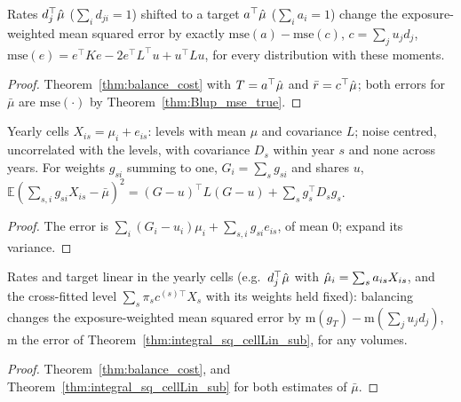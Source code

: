 \begin{theorem}\label{thm:Core_balance_cost_portLin}
  \leanok
  Rates $d_j^\top\hat\mu$ ($\sum_i d_{ji} = 1$) shifted to a target $a^\top\hat\mu$ ($\sum_i a_i = 1$) change
  the exposure-weighted mean squared error by exactly $\mathrm{mse}(a) - \mathrm{mse}(c)$,
  $c = \sum_j u_jd_j$, $\mathrm{mse}(e) = e^\top Ke - 2e^\top L^\top u + u^\top Lu$, for every
  distribution with these moments.
\end{theorem}
\begin{proof}
  \leanok
  Theorem~\ref{thm:balance_cost} with $T = a^\top\hat\mu$ and $\bar r = c^\top\hat\mu$; both errors for
  $\bar\mu$ are $\mathrm{mse}(\cdot)$ by Theorem~\ref{thm:Blup_mse_true}.
\end{proof}

\begin{theorem}\label{thm:integral_sq_cellLin_sub}
  \leanok
  Yearly cells $X_{is} = \mu_i + e_{is}$: levels with mean $\mu$ and covariance $L$; noise centred,
  uncorrelated with the levels, with covariance $D_s$ within year $s$ and none across years. For weights
  $g_{si}$ summing to one, $G_i = \sum_s g_{si}$ and shares $u$,
  $\mathbb E(\sum_{s,i}g_{si}X_{is} - \bar\mu)^2 = (G - u)^\top L(G - u) + \sum_s g_s^\top D_sg_s$.
\end{theorem}
\begin{proof}
  \leanok
  The error is $\sum_i(G_i - u_i)\mu_i + \sum_{s,i}g_{si}e_{is}$, of mean $0$; expand its variance.
\end{proof}

\begin{theorem}\label{thm:balance_cost_cellLin}
  \leanok
  Rates and target linear in the yearly cells (e.g.\ $d_j^\top\hat\mu$ with $\hat\mu_i = \sum_s a_{is}X_{is}$, and
  the cross-fitted level $\sum_s\pi_sc^{(s)\top}X_s$ with its weights held fixed): balancing changes the
  exposure-weighted mean squared error by $\mathrm m(g_T) - \mathrm m(\sum_j u_jd_j)$, $\mathrm m$ the error
  of Theorem~\ref{thm:integral_sq_cellLin_sub}, for any volumes.
\end{theorem}
\begin{proof}
  \leanok
  Theorem~\ref{thm:balance_cost}, and Theorem~\ref{thm:integral_sq_cellLin_sub} for both estimates of $\bar\mu$.
\end{proof}

